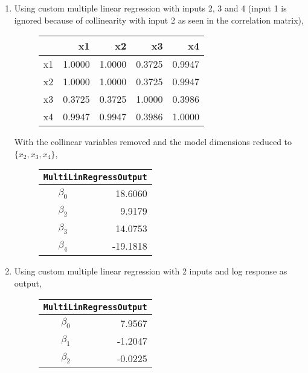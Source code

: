 \begin{enumerate}
\begin{figure}[H]
\end{figure}

\item Using custom multiple linear regression with inputs 2, 3 and 4 (input 1 is ignored because of collinearity with input 2 as seen in the correlation matrix),

\begin{figure}[H]
	\centering
	  \renewcommand{\arraystretch}{2}
	\begin{tabular}{lrrrr}
		\toprule
		 &      x1 &      x2 &      x3 &      x4 \\
		\midrule
		x1 &  1.0000 &  1.0000 &  0.3725 &  0.9947 \\
		x2 &  1.0000 &  1.0000 &  0.3725 &  0.9947 \\
		x3 &  0.3725 &  0.3725 &  1.0000 &  0.3986 \\
		x4 &  0.9947 &  0.9947 &  0.3986 &  1.0000 \\
		\bottomrule
	\end{tabular}
\end{figure}

With the collinear variables removed and the model dimensions reduced to $ \{x_2, x_3, x_4\} $,

\begin{figure}[H]
	\centering
	\begin{tabular}{@{}rr@{}}
		\toprule
		\multicolumn{2}{c}{\texttt{MultiLinRegressOutput}} \\
		\midrule
		$\beta_0$ &          18.6060 \\
		$\beta_2$ &           9.9179 \\
		$\beta_3$ &          14.0753 \\
		$\beta_4$ &         -19.1818 \\
		\bottomrule
	\end{tabular}
\end{figure}


\item Using custom multiple linear regression with 2 inputs and log response as output,

\begin{figure}[H]
	\centering
	\begin{tabular}{@{}rr@{}}
		\toprule
		\multicolumn{2}{c}{\texttt{MultiLinRegressOutput}} \\
		\midrule
		$\beta_0$ &           7.9567 \\
		$\beta_1$ &          -1.2047 \\
		$\beta_2$ &          -0.0225 \\
		\bottomrule
	\end{tabular}
\end{figure}


\end{enumerate}
